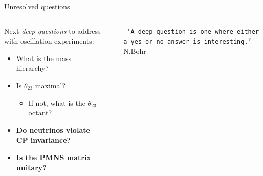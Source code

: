 \begin{frame}{Unresolved questions}

\begin{columns}[T]
  \begin{column}{0.70\textwidth}
     Next {\em deep questions} to address with oscillation experiments:\\
     \vspace{0.4cm}
     \begin{itemize}
       \item What is the mass hierarchy?
       \vspace{0.3cm}
       \item Is $\theta_{23}$ maximal?
         \begin{itemize}
           \item If not, what is the $\theta_{23}$ octant?
         \end{itemize}
       \vspace{0.3cm}
       \item {\bf Do neutrinos violate CP invariance?}
       \vspace{0.3cm}
       \item {\bf Is the PMNS matrix unitary?}
     \end{itemize}
  \end{column}
  \begin{column}{0.05\textwidth}
  \end{column}
  \begin{column}{0.25\textwidth}
    \begin{block}{}
     {\color{magenta}
        {\tt \small
         `A deep question is one where either a yes
          or no answer is interesting.'\\}
          \vspace{0.3cm}
          N.Bohr
     }
    \end{block}
  \end{column}
\end{columns}
\end{frame}


%
%

